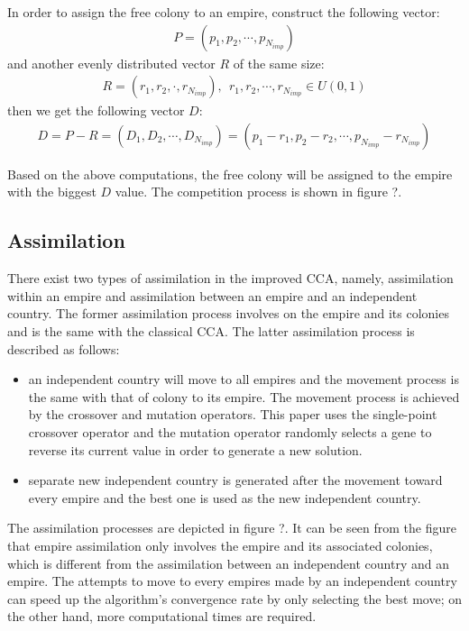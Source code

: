 In order to assign the free colony to an empire, construct the following vector:
\begin{align}
	P = (p_1, p_2, \cdots, p_{N_{imp}})
\end{align}
and another evenly distributed vector $R$ of the same size:
\begin{align}
	R = (r_1, r_2, \cdot, r_{N_{imp}}), \ \ r_1, r_2, \cdots, r_{N_{imp}} \in U(0, 1)
\end{align}
then we get the following vector $D$:
\begin{align}
	D = P-R 
	= (D_1, D_2, \cdots, D_{N_{imp}}) 
	= (p_1 - r_1, p_2 - r_2, \cdots, p_{N_{imp}} - r_{N_{imp}})
\end{align}

Based on the above computations, the free colony will be assigned to the empire with the biggest $D$ value.
The competition process is shown in figure ?.

\subsection{Assimilation}
There exist two types of assimilation in the improved CCA, namely, assimilation within an empire and assimilation between an empire and an independent country.
The former assimilation process involves on the empire and its colonies and is the same with the classical CCA.
The latter assimilation process is described as follows:
\begin{itemize}
	\item an independent country will move to all empires and the movement process is the same with that of colony to its empire.
	The movement process is achieved by the crossover and mutation operators.
	This paper uses the single-point crossover operator and the mutation operator randomly selects a gene to reverse its current value in order to generate a new solution.
	\item separate new independent country is generated after the movement toward every empire and the best one is  used as the new independent country.
\end{itemize}

The assimilation processes are depicted in figure ?.
It can be seen from the figure that empire assimilation only involves the empire and its associated colonies, which is different from the assimilation between an independent country and an empire.
The attempts to move to every empires made by an independent country can speed up the algorithm's convergence rate by only selecting the best move; on the other hand, more computational times are required.


